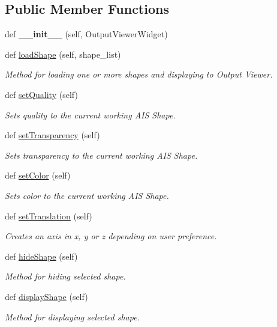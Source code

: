 \subsection*{Public Member Functions}
\begin{DoxyCompactItemize}
\item 
\hypertarget{a00101_aeafd1ea7cbe63a409e51e546db403bfd}{}\label{a00101_aeafd1ea7cbe63a409e51e546db403bfd} 
def {\bfseries \+\_\+\+\_\+init\+\_\+\+\_\+} (self, Output\+Viewer\+Widget)
\item 
def \hyperlink{a00101_a8833b4dba535cb76318777c031cf08b5}{load\+Shape} (self, shape\+\_\+list)
\begin{DoxyCompactList}\small\item\em Method for loading one or more shapes and displaying to Output Viewer. \end{DoxyCompactList}\item 
def \hyperlink{a00101_abe8c1dbcfe98b9f86a0560dd1e8b853a}{set\+Quality} (self)
\begin{DoxyCompactList}\small\item\em Sets quality to the current working A\+IS Shape. \end{DoxyCompactList}\item 
def \hyperlink{a00101_a8d7fdd0bde28afe34d3793c8bcf060fa}{set\+Transparency} (self)
\begin{DoxyCompactList}\small\item\em Sets transparency to the current working A\+IS Shape. \end{DoxyCompactList}\item 
def \hyperlink{a00101_ac659823f3085963daf751a6a94b366a7}{set\+Color} (self)
\begin{DoxyCompactList}\small\item\em Sets color to the current working A\+IS Shape. \end{DoxyCompactList}\item 
def \hyperlink{a00101_a1cab1ea26a1cd0091d88106b6b4715bb}{set\+Translation} (self)
\begin{DoxyCompactList}\small\item\em Creates an axis in x, y or z depending on user preference. \end{DoxyCompactList}\item 
def \hyperlink{a00101_ad4293087adb512ea61fe0c3429c0e08c}{hide\+Shape} (self)
\begin{DoxyCompactList}\small\item\em Method for hiding selected shape. \end{DoxyCompactList}\item 
def \hyperlink{a00101_aba26c11e7e7ec6c2c6709a27cbeaaf69}{display\+Shape} (self)
\begin{DoxyCompactList}\small\item\em Method for displaying selected shape. \end{DoxyCompactList}\end{DoxyCompactItemize}
